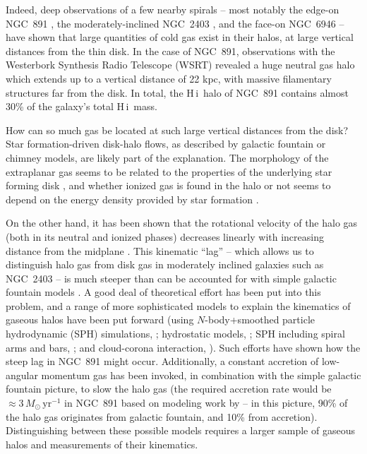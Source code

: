 \documentclass[oldversion]{aa}
\newcommand{\HI}{{\sc H\,i}}
\begin{document}
Indeed, deep observations of a few nearby spirals -- most notably the edge-on NGC~891 \citep{oosterloo_etal_2007}, the moderately-inclined NGC~2403 \citep{fraternali_etal_2002}, and the face-on NGC~6946 \citep{boomsma_etal_2008} -- have shown that large quantities of cold gas exist in their halos, at large vertical distances from the thin disk. In the case of NGC~891, observations with the Westerbork Synthesis Radio Telescope (WSRT) revealed a huge neutral gas halo \cite[e.g.][see their Figure 1]{oosterloo_etal_2007} which extends up to a vertical distance of 22 kpc, with massive filamentary structures far from the disk. In total, the \HI\ halo of NGC~891 contains almost 30\% of the galaxy's total \HI\ mass.

How can so much gas be located at such large vertical distances from the disk? Star formation-driven disk-halo flows, as described by galactic fountain \citep[e.g.,][]{bregman_1980} or chimney \citep{norman_ikeuchi_1989} models, are likely part of the explanation. The morphology of the extraplanar gas seems to be related to the properties of the underlying star forming disk \citep[at least in its ionized phase; e.g.,][]{rand_1996}, and whether ionized gas is found in the halo or not seems to depend on the energy density provided by star formation \citep{rossa_dettmar_2003a}.

On the other hand, it has been shown that the rotational velocity of the halo gas (both in its neutral and ionized phases) decreases linearly with increasing distance from the midplane \citep{fraternali_etal_2005,heald_etal_2006,kamphuis_etal_2007}. This kinematic ``lag'' -- which allows us to distinguish halo gas from disk gas in moderately inclined galaxies such as NGC~2403 -- is much steeper than can be accounted for with simple galactic fountain models \citep[the discrepancy is observed to be a factor of two or more;][]{heald_etal_2007}. A good deal of theoretical effort has been put into this problem, and a range of more sophisticated models to explain the kinematics of gaseous halos have been put forward (using $N$-body+smoothed particle hydrodynamic (SPH) simulations, \citet{kaufmann_etal_2006}; hydrostatic models, \citet{benjamin_2000,barnabe_etal_2006,marinacci_etal_2010a}; SPH including spiral arms and bars, \citet{struck_smith_2009}; and cloud-corona interaction, \citet{marinacci_etal_2010b}). Such efforts have shown how the steep lag in NGC~891 might occur. Additionally, a constant accretion of low-angular momentum gas has been invoked, in combination with the simple galactic fountain picture, to slow the halo gas (the required accretion rate would be $\approx3\,M_{\odot}\,\mathrm{yr}^{-1}$ in NGC~891 based on modeling work by \citet{fraternali_binney_2008} -- in this picture, 90\% of the halo gas originates from galactic fountain, and 10\% from accretion). Distinguishing between these possible models requires a larger sample of gaseous halos and measurements of their kinematics.
\end{document}
